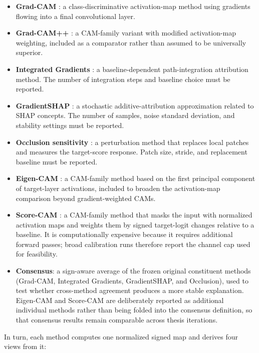 \begin{itemize}
	\tightlist
	\item
	\textbf{Grad-CAM} \cite{ref-gradcam}: a
	class-discriminative activation-map method using gradients flowing
	into a final convolutional layer.
	\item
	\textbf{Grad-CAM++} 
	\cite{ref-gradcampp}: a CAM-family variant with modified
	activation-map weighting, included as a comparator rather than assumed
	to be universally superior.
	\item
	\textbf{Integrated Gradients} 
	\cite{ref-integrated-gradients}: a baseline-dependent path-integration
	attribution method. The number of integration steps and baseline
	choice must be reported.
	\item
	\textbf{GradientSHAP} \cite{ref-shap}: a
	stochastic additive-attribution approximation related to SHAP
	concepts. The number of samples, noise standard deviation, and
	stability settings must be reported.
	\item
	\textbf{Occlusion sensitivity} 
	\cite{ref-occlusion-zeiler}: a perturbation method that replaces local
	patches and measures the target-score response. Patch size, stride,
	and replacement baseline must be reported.
	\item
	\textbf{Eigen-CAM}  \cite{ref-eigen-cam}: a
	CAM-family method based on the first principal component of
	target-layer activations, included to broaden the activation-map
	comparison beyond gradient-weighted CAMs.
	\item
	\textbf{Score-CAM} \cite{ref-scorecam}: a
	CAM-family method that masks the input with normalized activation maps
	and weights them by signed target-logit changes relative to a
	baseline. It is computationally expensive because it requires
	additional forward passes; broad calibration runs therefore report the
	channel cap used for feasibility.
	\item
	\textbf{Consensus}: a sign-aware average of the
	frozen original constituent methods (Grad-CAM,
	Integrated Gradients, GradientSHAP, and
	Occlusion), used to test whether cross-method agreement
	produces a more stable explanation. Eigen-CAM and Score-CAM are
	deliberately reported as additional individual methods rather than
	being folded into the consensus definition, so that consensus results
	remain comparable across thesis iterations.
\end{itemize}

In turn, each method computes one normalized signed map and
derives four views from it:

